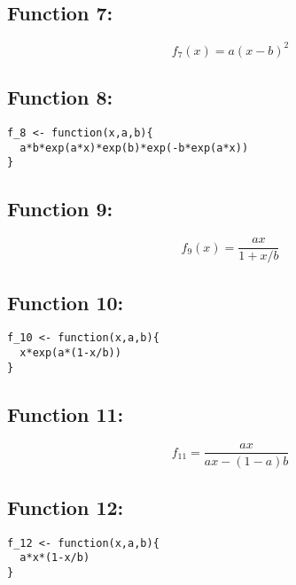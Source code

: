 \documentclass[12pt]{article}
\begin{document}
\subsection*{Function 7:}
$$
f_7(x) = a(x-b)^2
$$

\subsection*{Function 8:\\}
\begin{verbatim}
f_8 <- function(x,a,b){
  a*b*exp(a*x)*exp(b)*exp(-b*exp(a*x))
}
\end{verbatim}
\vspace{1mm}

\subsection*{Function 9:}
$$
f_9(x) = \frac{ax}{1+x/b}
$$

\subsection*{Function 10:\\}
\begin{verbatim}
f_10 <- function(x,a,b){
  x*exp(a*(1-x/b))
}
\end{verbatim}
\vspace{1mm}

\subsection*{Function 11:}
$$
f_{11}=\frac{ax}{ax-(1-a)b}
$$

\subsection*{Function 12:\\}
\begin{verbatim}
f_12 <- function(x,a,b){
  a*x*(1-x/b)
}
\end{verbatim}

\clearpage
\end{document}
